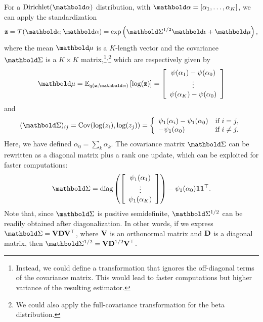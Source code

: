 \documentclass{article}
\begin{document}
For a $\textrm{Dirichlet}(\balpha)$ distribution, with $\balpha=[\alpha_1,\ldots,\alpha_K]$, we can apply the standardization
\begin{equation}
\bz=\Tcal(\beps;\balpha) = \exp\left(\bSigma^{1/2}\beps+\bmu\right),
\end{equation}
where the mean $\bmu$ is a $K$-length vector and the covariance $\bSigma$ is a $K\times K$ matrix,\footnote{Instead, we could define a transformation that ignores the off-diagonal terms of the covariance matrix. This would lead to faster computations but higher variance of the resulting estimator.}$^{,}$\footnote{We could also apply the full-covariance transformation for the beta distribution.} which are respectively given by
\begin{equation}
 \begin{split}
  \bmu = \E{q(\bz;\balpha)}{\log(\bz)} =
  \left[
  \begin{array}{c}
   \psi(\alpha_1)-\psi(\alpha_0) \\
   \vdots \\
   \psi(\alpha_K)-\psi(\alpha_0) \\
   \end{array}
  \right]
 \end{split}
\end{equation}
and
\begin{equation}
 (\bSigma)_{ij} = \textrm{Cov}(\log(z_i),\log(z_j)) =
 \left\{
  \begin{array}{ll}
   \psi_1(\alpha_i)-\psi_1(\alpha_0) & \textrm{if } i=j, \\
   -\psi_1(\alpha_0) & \textrm{if } i\neq j. \\
  \end{array}
 \right.
\end{equation}
Here, we have defined $\alpha_0=\sum_k \alpha_k$. The covariance matrix $\bSigma$ can be rewritten as a diagonal matrix plus a rank one update, which can be exploited for faster computations:
\begin{equation}
 \bSigma = \textrm{diag}\left(
  \left[
  \begin{array}{c}
   \psi_1(\alpha_1) \\
   \vdots \\
   \psi_1(\alpha_K) \\
   \end{array}
  \right]
 \right) - \psi_1(\alpha_0) \bone\bone^\top.
\end{equation}
Note that, since $\bSigma$ is positive semidefinite, $\bSigma^{1/2}$ can be readily obtained after diagonalization. In other words, if we express $\bSigma = \bV \bD \bV^\top$, where $\mathbf{V}$ is an orthonormal matrix and $\mathbf{D}$ is a diagonal matrix, then $\bSigma^{1/2} = \bV \bD^{1/2} \bV^\top$.
\end{document}
